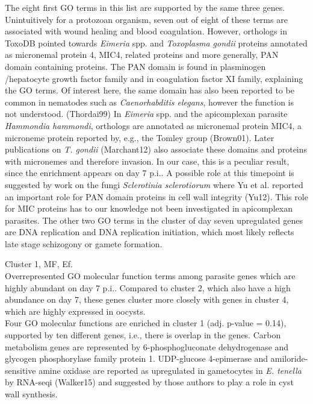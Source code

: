 \documentclass{article}
\begin{document}
\newline
The eight first GO terms in this list are supported by the same three genes. 
Unintuitively for a protozoan organism, seven out of eight of these terms are associated with 
wound healing and blood coagulation.
However, orthologs in ToxoDB pointed towards \textit{Eimeria} spp. and \textit{Toxoplasma gondii} 
proteins annotated as micronemal protein 4, MIC4, related proteins and more generally, PAN 
domain containing proteins. The PAN domain is found in plasminogen
/hepatocyte growth factor family and in coagulation factor XI family, explaining the GO terms. 
Of interest here, the same domain has also been reported to be common in 
nematodes such as \textit{Caenorhabditis elegans}, however the
function is not understood. (Thordai99)
In \textit{Eimeria} spp. and the apicomplexan parasite \textit{Hammondia hammondi}, orthologs
are annotated as micronemal protein MIC4, a microneme protein reported by, e.g., the Tomley group
(Brown01).
Later publications on \textit{T. gondii} (Marchant12) also associate these domains and proteins with 
micronemes and therefore invasion. In our case, this is a peculiar result, since the enrichment appears on
day 7 p.i.. A possible role at this timepoint is suggested by work on the fungi 
\textit{Sclerotinia sclerotiorum} where Yu et al. reported an important role for PAN domain
proteins in cell wall integrity (Yu12). This role for MIC proteins has to our knowledge 
not been investigated in apicomplexan parasites. 
The other two GO terms in the cluster of day seven upregulated genes are DNA replication and DNA 
replication initiation, which most likely reflects late stage schizogony or gamete formation.


Cluster 1, MF, Ef.\\
Overrepresented GO molecular function terms among parasite genes which are 
highly abundant on day 7 p.i.. Compared to cluster 2, which also have a high
abundance on day 7, these genes cluster more closely with genes in cluster 4, 
which are highly expressed in oocysts.\\
Four GO molecular functions are enriched in cluster 1 (adj. p-value = 0.14), 
supported by ten different genes, i.e., there is overlap in the genes. 
Carbon metabolism genes are represented by 6-phosphogluconate dehydrogenase and glycogen phosphorylase 
family protein 1. UDP-glucose 4-epimerase and amiloride-sensitive amine oxidase are 
reported as upregulated in gametocytes in \textit{E. tenella} by RNA-seqi (Walker15) and 
suggested by those authors to play a role in cyst wall synthesis.

\end{document}
